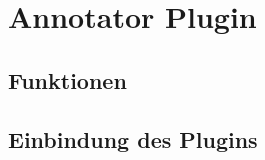 \section{Annotator Plugin}
    \label{section:solutionDetailsAnnotatorPlugin}
    \subsection{Funktionen}
    \subsection{Einbindung des Plugins}